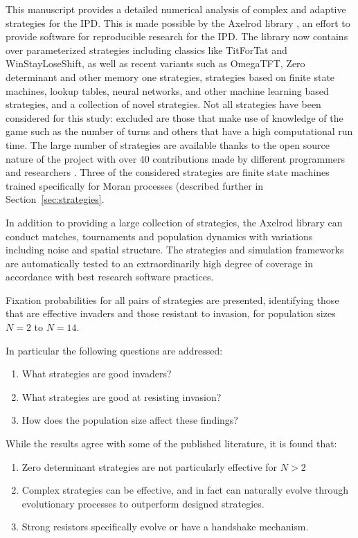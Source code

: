 \documentclass{article}
\begin{document}
This manuscript provides a detailed numerical analysis of
\textbf{}complex and adaptive strategies for the
IPD\@. This is made possible by the Axelrod library \cite{axelrodproject}, an
effort to provide software for reproducible research for the IPD\@. The library
now contains over parameterized
strategies including classics like TitForTat and WinStayLoseShift, as well as
recent variants such as OmegaTFT, Zero determinant and other memory one
strategies, strategies based on finite state machines, lookup tables, neural
networks, and other machine learning based strategies, and a collection of novel
strategies. Not all strategies have been considered for this study: excluded
are those that make use of knowledge of the game such as the number of turns
and others that have a high
computational run time. The large number of strategies are available thanks to
the open source nature of the project with over 40 contributions made by
different programmers and researchers \cite{Knight2016}. Three of the considered
strategies are finite state machines trained specifically for Moran processes
(described further in Section~\ref{sec:strategies}.

In addition to providing a large collection of strategies, the Axelrod library
can conduct matches, tournaments and population
dynamics with variations including noise and spatial structure.
The strategies and simulation frameworks are
automatically tested to an extraordinarily high degree of coverage in accordance
with best research software practices.

Fixation probabilities for all pairs of
strategies are presented, identifying those that are effective invaders and
those resistant to invasion, for population sizes $N=2$ to $N=14$.

In particular the following questions are addressed:
\begin{enumerate}
    \item What strategies are good invaders?
    \item What strategies are good at resisting invasion?
    \item How does the population size affect these findings?
\end{enumerate}

While the results agree with some of the published literature, it is found that:

\begin{enumerate}
 \item Zero determinant strategies are not particularly effective for $N > 2$
 \item Complex strategies can be effective, and in fact can naturally evolve
     through evolutionary processes to outperform designed strategies.
 \item Strong resistors specifically evolve or have a handshake mechanism.
\end{enumerate}
\end{document}

